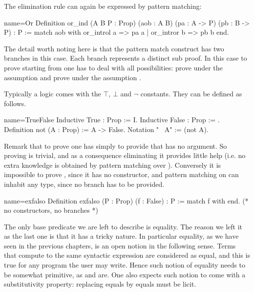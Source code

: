 The elimination rule can again be expressed by pattern matching:

\begin{coq}{name=Or}{}
Definition or_ind (A B P : Prop)
  (aob : A \/ B) (pa : A -> P) (pb : B -> P) : P :=
  match aob with or_introl a => pa a | or_intror b => pb b end.
\end{coq}

The detail worth noting here is that the pattern match construct has two
branches in this case.  Each branch represents a distinct sub proof.  In this
case to prove  starting from  one has to deal with all
possibilities: prove  under the assumption  and prove 
under the assumption .

Typically a logic comes with the $\top$, $\bot$ and $\neg$ constants.
They can be defined as follows.

\begin{coq}{name=TrueFalse}{}
Inductive True : Prop := I.
Inductive False : Prop := .
Definition not (A : Prop) := A -> False.
Notation "~ A" := (not A).
\end{coq}

Remark that to prove  one has simply to provide  that has no
argument.  So proving  is trivial, and as a consequence eliminating it
provides little help (i.e. no extra knowledge is obtained by pattern matching
over ).  Conversely it is impossible to prove , since it has no
constructor, and pattern matching on  can inhabit any type, since no
branch has to be provided.

\begin{coq}{name=exfalso}{}
Definition exfalso (P : Prop) (f : False) : P :=
  match f with end.  (* no constructors, no branches *)
\end{coq}

The only base predicate we are left to describe is equality.  The reason we
left it as the last one is that it has a tricky nature.  In particular
equality, as we have seen in the previous chapters, is an open notion
in the following sense.  Terms that compute to the same syntactic expression
are considered as equal, and this is true for any program the user may write.
Hence such notion of equality needs to be somewhat primitive, as
 and  are.  One also expects such notion to come
with a substitutivity property: replacing equals by equals must be licit.

